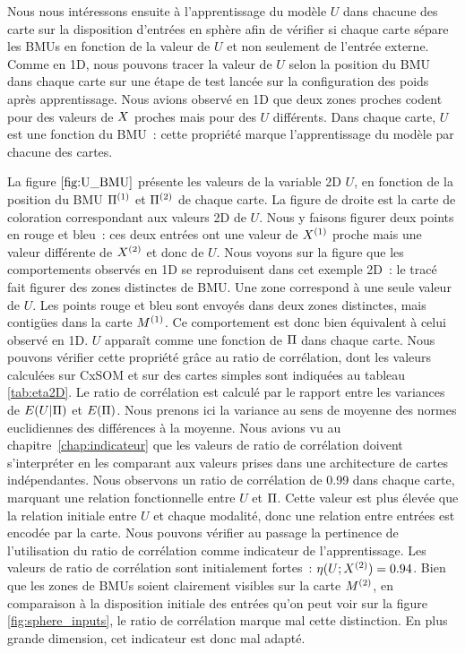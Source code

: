 \documentclass[../main]{subfiles}
\begin{document}
Nous nous intéressons ensuite à l'apprentissage du modèle $U$ dans chacune des carte sur la disposition d'entrées en sphère afin de vérifier si chaque carte sépare les BMUs en fonction de la valeur de $U$ et non seulement de l'entrée externe.
Comme en 1D, nous pouvons tracer la valeur de $U$ selon la position du BMU dans chaque carte sur une étape de test lancée sur la configuration des poids après apprentissage.
Nous avions observé en 1D que deux zones proches codent pour des valeurs de $X$ proches mais pour des $U$ différents. Dans chaque carte, $U$ est une fonction du BMU~: cette propriété marque l'apprentissage du modèle par chacune des cartes. 

La figure $\ref{fig:U_BMU}$ présente les valeurs de la variable 2D $U$, en fonction de la position du BMU $\Pi^{({1})}$ et $\Pi^{({2})}$ de chaque carte. La figure de droite est la carte de coloration correspondant aux valeurs 2D de $U$.
Nous y faisons figurer deux points en rouge et bleu~: ces deux entrées ont une valeur de $X^{({1})}$ proche mais une valeur différente de $X^{({2})}$ et donc de $U$.
Nous voyons sur la figure que les comportements observés en 1D se reproduisent dans cet exemple 2D~: le tracé fait figurer des zones distinctes de BMU. Une zone correspond à une seule valeur de $U$.
Les points rouge et bleu sont envoyés dans deux zones distinctes, mais contigües dans la carte $M^{({1})}$. Ce comportement est donc bien équivalent à celui observé en 1D.
$U$ apparaît comme une fonction de $\Pi$ dans chaque carte. 
Nous pouvons vérifier cette propriété grâce au ratio de corrélation, dont les valeurs calculées sur CxSOM et sur des cartes simples sont indiquées au tableau \ref{tab:eta2D}. Le ratio de corrélation est calculé par le rapport entre les variances de $E(U|\Pi)$ et $E(\Pi)$. Nous prenons ici la variance au sens de moyenne des normes euclidiennes des différences à la moyenne.
Nous avions vu au chapitre~\ref{chap:indicateur} que les valeurs de ratio de corrélation doivent s'interpréter en les comparant aux valeurs prises dans une architecture de cartes indépendantes. Nous observons un ratio de corrélation de 0.99 dans chaque carte, marquant une relation fonctionnelle entre $U$ et $\Pi$. Cette valeur est plus élevée que la relation initiale entre $U$ et chaque modalité, donc une relation entre entrées est encodée par la carte.
Nous pouvons vérifier au passage la pertinence de l'utilisation du ratio de corrélation comme indicateur de l'apprentissage.
Les valeurs de ratio de corrélation sont initialement fortes~: $\eta(U;X^{({2})}) = 0.94$. Bien que les zones de BMUs soient clairement visibles sur la carte $M^{({2})}$, en comparaison à la disposition initiale des entrées qu'on peut voir sur la figure \ref{fig:sphere_inputs}, le ratio de corrélation marque mal cette distinction. En plus grande dimension, cet indicateur est donc mal adapté. 
\end{document}
